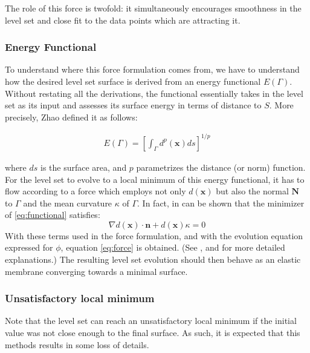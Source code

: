\documentclass{article}
\begin{document}
The role of this force is twofold: it simultaneously encourages smoothness in
the level set and close fit to the data points which are attracting it.

\subsubsection{Energy Functional}
To understand where this force formulation comes from, we have to understand how
the desired level set surface is derived from an energy functional $E(\Gamma)$.
Without restating all the derivations, the functional essentially takes in the
level set as its input and assesses its surface energy in terms of distance to
$S$. More precisely, Zhao\cite{zhao2000implicit} defined it as follows:

\begin{align}
    \label{eq:functional}
    E(\Gamma) = [\int_\Gamma d^p(\mathbf{x}) ds]^{1/p}
\end{align}

where $ds$ is the surface area, and $p$ parametrizes the distance (or norm)
function. For the level set to evolve to a local minimum of this energy
functional, it has to flow according to a force which employs not only
$d(\mathbf{x})$ but also the normal $\mathbf{N}$ to $\Gamma$ and the mean
curvature $\kappa$ of $\Gamma$. In fact, in can be shown that the minimizer of
\eqref{eq:functional} satisfies:
\[
\nabla d(\mathbf{x}) \cdot \mathbf{n} + d(\mathbf{x}) \kappa = 0
\]
With these terms used in the force formulation, and with the evolution equation
expressed for $\phi$, equation \eqref{eq:force} is obtained. (See \cite{zhao2000implicit},
\cite{zhao2001fast} and \cite{savadjiev2003surface} for more detailed
explanations.) The resulting level set evolution should then behave as an
elastic membrane converging towards a minimal surface.


\subsubsection{Unsatisfactory local minimum}
Note that the level set can reach an unsatisfactory local minimum if the initial
value was not close enough to the final surface. As such, it is expected that
this methods results in some loss of details.
\end{document}
